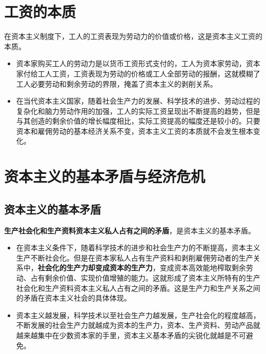 \documentclass[12pt,openany]{ctexbook}
\begin{document}
\section{工资的本质}
\begin{mdquote}
在资本主义制度下，工人的工资表现为劳动力的价值或价格，这是资本主义工资的本质。
\end{mdquote}
\begin{itemize}
  \item 资本家购买工人的劳动力是以货币工资形式支付的，工人为资本家劳动，资本家付给工人工资，工资表现为劳动的价格或工人全部劳动的报酬，这就模糊了工人必要劳动和剩余劳动的界限，掩盖了资本主义的剥削关系。
  \item 在当代资本主义国家，随着社会生产力的发展、科学技术的进步、劳动过程的复杂化和脑力劳动作用的加强，工人的实际工资呈现出不断提高的趋势，但是与其创造的剩余价值的增长幅度相比，实际工资提高的幅度还是较小的。只要资本和雇佣劳动的基本经济关系不变，资本主义工资的本质就不会发生根本变化。
\end{itemize}
\section{资本主义的基本矛盾与经济危机}
\subsection{资本主义的基本矛盾}
\textbf{生产社会化和生产资料资本主义私人占有之间的矛盾}，是资本主义的基本矛盾。
\begin{itemize}
  \item 在资本主义条件下，随着科学技术的进步和社会生产力的不断提高，资本主义生产不断社会化。但是在资本家私人占有生产资料和剥削雇佣劳动者的生产关系中，\textbf{社会化的生产力却变成资本的生产力}，变成资本高效能地榨取剩余劳动、占有剩余价值、实现价值增殖的能力。这就形成了资本主义所特有的生产社会化和生产资料资本主义私人占有之间的矛盾。这是生产力和生产关系之间的矛盾在资本主义社会的具体体现。
  \item 资本主义越发展，科学技术以至社会生产力越发展，生产社会化的程度越高，不断发展的社会生产力就越成为资本的生产力，资本、生产资料、劳动产品就越来越集中在少数资本家的手里，资本主义基本矛盾的尖锐化就越是不可避免。
\end{itemize}
\end{document}
